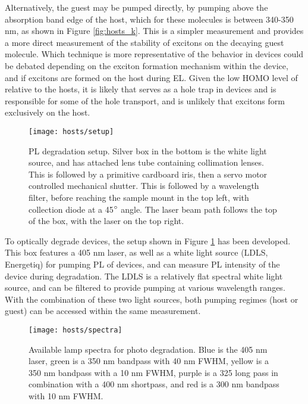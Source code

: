 \documentclass[../thesis.tex]{subfiles}
\begin{document}
Alternatively, the guest may be pumped directly, by pumping above the absorption band edge of the host, which for these molecules is between 340-350 nm, as shown in Figure \ref{fig:hosts_k}.
This is a simpler measurement and provides a more direct measurement of the stability of excitons on the decaying guest molecule.
Which technique is more representative of the behavior in devices could be debated depending on the exciton formation mechanism within the device, and if excitons are formed on the host during EL.
Given the low HOMO level of  \irppy relative to the hosts, it is likely that \irppy serves as a hole trap in devices and is responsible for some of the hole transport, and is unlikely that excitons form exclusively on the host.

\begin{figure}[ht]
\centering
\texttt{[image: hosts/setup]}
\caption{PL degradation setup. Silver box in the bottom is the white light source, and has attached lens tube containing collimation lenses.  This is followed by a primitive cardboard iris, then a servo motor controlled mechanical shutter.  This is followed by a wavelength filter, before reaching the sample mount in the top left, with collection diode at a 45$\degree$ angle.  The laser beam path follows the top of the box, with the laser on the top right.}
\label{fig:hosts_setup}
\end{figure}

To optically degrade devices, the setup shown in Figure \ref{fig:hosts_setup} has been developed.
This box features a 405 nm laser, as well as a white light source (LDLS, Energetiq) for pumping PL of devices, and can measure PL intensity of the device during degradation.
The LDLS is a relatively flat spectral white light source, and can be filtered to provide pumping at various wavelength ranges.
With the combination of these two light sources, both pumping regimes (host or guest) can be accessed within the same measurement.

\begin{wrapfigure}{r}{.5\textwidth}
\centering
\texttt{[image: hosts/spectra]}
\caption{Available lamp spectra for photo degradation. Blue is the 405 nm laser, green is a 350 nm bandpass with 40 nm FWHM, yellow is a 350 nm bandpass with a 10 nm FWHM, purple is a 325 long pass in combination with a 400 nm shortpass, and red is a 300 nm bandpass with 10 nm FWHM. }
\label{fig:hosts_spectra}
\end{wrapfigure}
\end{document}
